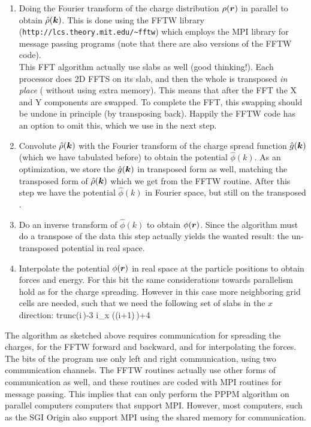 \begin{enumerate}
\item	Doing the Fourier transform of the charge distribution $\rho(\mbox{\boldmath ${r}$})$ 
	in parallel to obtain $\hat{\rho}(\mbox{\boldmath ${k}$})$. This is done using
	the FFTW library ({\tt http://lcs.theory.mit.edu/\~{ }fftw})
	which employs the MPI library for message passing programs
	(note that there are also  versions
	of the FFTW code).\\
	This FFT algorithm actually use slabs as well (good
	thinking!).  Each processor does 2D FFTS on its slab, and then
	the whole {\fftgrid} is transposed {\em in place}
	({\ie} without using extra memory).  This means that after the
	FFT the X and Y components are swapped.  To complete the FFT,
	this swapping should be undone in principle (by transposing
	back).  Happily the FFTW code has an option to omit this,
	which we use in the next step.
\item	Convolute $\hat{\rho}(\mbox{\boldmath ${k}$})$ with the Fourier transform of the
	charge spread function $\hat{g}(\mbox{\boldmath ${k}$})$ (which we have tabulated before)
	to obtain the potential $\hat{\phi}(k)$. 
	As an optimization, we store the $\hat{g}(\mbox{\boldmath ${k}$})$  in transposed form
	as well, matching the transposed form of $\hat{\rho}(\mbox{\boldmath ${k}$})$
	which we get from the FFTW routine. After this step we have the 
	potential $\hat{\phi}(k)$ in Fourier space, but still on the transposed
	{\fftgrid}.
\item	Do an inverse transform of $\hat{\phi}(k)$ to obtain
	${\phi}(\mbox{\boldmath ${r}$})$. Since the algorithm must do a transpose of the data
	this step actually yields the wanted result: the un-transposed
	potential in real space.
\item	Interpolate the potential ${\phi}(\mbox{\boldmath ${r}$})$ in real space at the particle
	positions to obtain forces and energy. For this bit the same considerations
	towards parallelism hold as for the charge spreading. However in this
	case more neighboring grid cells are needed, such that we need
	the following set of {\fftgrid} slabs in the $x$ direction:
	\beq
	{\rm trunc}\left(i\,\right)-3 \le i_x \left((i+1)\,\right)+4
	\eeq

\end{enumerate}
The algorithm as sketched above requires communication for spreading
the charges, for the FFTW forward and backward, and for interpolating
the forces.  The {\gromacs} bits of the program use only left and
right communication, {\ie}  using two communication channels. The FFTW
routines actually use other forms of communication as well, and these
routines are coded with MPI routines for message passing. This implies
that {\gromacs} can only perform the PPPM algorithm on parallel
computers computers that support MPI. However, most  computers, such as the SGI Origin also support MPI using the
shared memory for communication.

